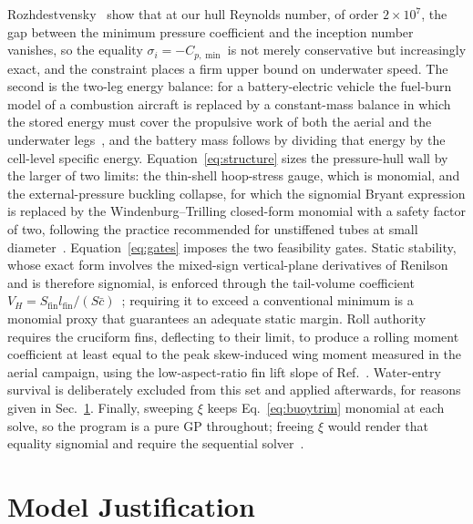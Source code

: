 \documentclass[conf]{new-aiaa}
\begin{document}
Rozhdestvensky~\cite{amromin2022cavitation} show that at our hull Reynolds number, of order
$2\times10^{7}$, the gap between the minimum pressure coefficient and the inception number vanishes,
so the equality $\sigma_i=-C_{p,\min}$ is not merely conservative but increasingly exact, and the
constraint places a firm upper bound on underwater speed. The second is the two-leg energy balance:
for a battery-electric vehicle the fuel-burn model of a combustion aircraft is replaced by a
constant-mass balance in which the stored energy must cover the propulsive work of both the aerial
and the underwater legs~\cite{allen2000propulsion,lin2026energies}, and the battery mass follows by
dividing that energy by the cell-level specific energy. Equation~\eqref{eq:structure} sizes the
pressure-hull wall by the larger of two limits: the thin-shell hoop-stress gauge, which is monomial,
and the external-pressure buckling collapse, for which the signomial Bryant expression is replaced by
the Windenburg--Trilling closed-form monomial with a safety factor of two, following the practice
recommended for unstiffened tubes at small diameter~\cite{shinoka2024structural}.
Equation~\eqref{eq:gates} imposes the two feasibility gates. Static stability, whose exact form
involves the mixed-sign vertical-plane derivatives of Renilson~\cite{renilson2018submarine} and is
therefore signomial, is enforced through the tail-volume coefficient $V_H=S_{\text{fin}}l_{\text{fin}}
/(S\bar c)$~\cite{hoerner1985fluid}; requiring it to exceed a conventional minimum is a monomial proxy
that guarantees an adequate static margin. Roll authority requires the cruciform fins, deflecting to
their limit, to produce a rolling moment coefficient at least equal to the peak skew-induced wing
moment measured in the aerial campaign, using the low-aspect-ratio fin lift slope of
Ref.~\cite{hoerner1985fluid}. Water-entry survival is deliberately excluded from this set and applied
afterwards, for reasons given in Sec.~\ref{sec:justify}. Finally, sweeping $\xi$ keeps
Eq.~\eqref{eq:buoytrim} monomial at each solve, so the program is a pure GP throughout; freeing $\xi$
would render that equality signomial and require the sequential
solver~\cite{hoburg2014geometric,boyd2007tutorial}.

\section{Model Justification}\label{sec:justify}
\end{document}
